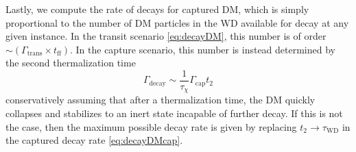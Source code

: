Lastly, we compute the rate of decays for captured DM, which is simply proportional to the number of DM particles in the WD available for decay at any given instance.  
In the transit scenario \eqref{eq:decayDM}, this number is of order $\sim (\Gamma_\text{trans} \times t_\text{ff})$.  
In the capture scenario, this number is instead determined by the second thermalization time
\begin{equation}
\Gamma_\text{decay} \sim  \frac{1}{\tau_\chi} \Gamma_\text{cap} t_2
\label{eq:decayDMcap}
\end{equation}
conservatively assuming that after a thermalization time, the DM quickly collapses and stabilizes to an inert state incapable of further decay.
If this is not the case, then the maximum possible decay rate is given by replacing $t_2 \to \tau_\text{WD}$ in the captured decay rate \eqref{eq:decayDMcap}.